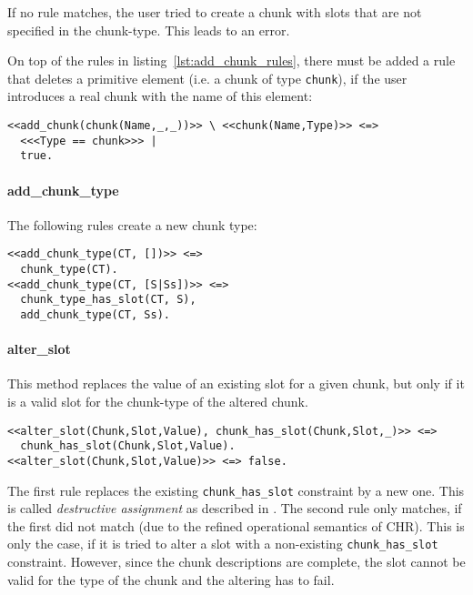 If no rule matches, the user tried to create a chunk with slots that are not specified in the chunk-type. This leads to an error.

On top of the rules in listing~\ref{lst:add_chunk_rules}, there must be added a rule that deletes a primitive element (i.e. a chunk of type \lstinline|chunk|), if the user introduces a real chunk with the name of this element:

\begin{lstlisting}[caption={Clean up primitive elements}]  
% delete chunk of Type chunk, if real chunk is added
<<add_chunk(chunk(Name,_,_))>> \ <<chunk(Name,Type)>> <=> 
  <<<Type == chunk>>> |
  true.
\end{lstlisting}


\paragraph{add\_chunk\_type}

The following rules create a new chunk type:

\begin{lstlisting}[caption={rules for \texttt{add\_chunk\_type}}]
<<add_chunk_type(CT, [])>> <=> 
  chunk_type(CT).
<<add_chunk_type(CT, [S|Ss])>> <=> 
  chunk_type_has_slot(CT, S), 
  add_chunk_type(CT, Ss).
\end{lstlisting}

\paragraph{alter\_slot}

This method replaces the value of an existing slot for a given chunk, but only if it is a valid slot for the chunk-type of the altered chunk.

\begin{lstlisting}
<<alter_slot(Chunk,Slot,Value), chunk_has_slot(Chunk,Slot,_)>> <=>
  chunk_has_slot(Chunk,Slot,Value).  
<<alter_slot(Chunk,Slot,Value)>> <=> false.
\end{lstlisting}

The first rule replaces the existing \lstinline|chunk_has_slot| constraint by a new one. This is called \emph{destructive assignment} as described in \cite[32]{fru_chr_book_2009}. The second rule only matches, if the first did not match (due to the refined operational semantics of CHR). This is only the case, if it is tried to alter a slot with a non-existing \lstinline|chunk_has_slot| constraint. However, since the chunk descriptions are complete, the slot cannot be valid for the type of the chunk and the altering has to fail.

